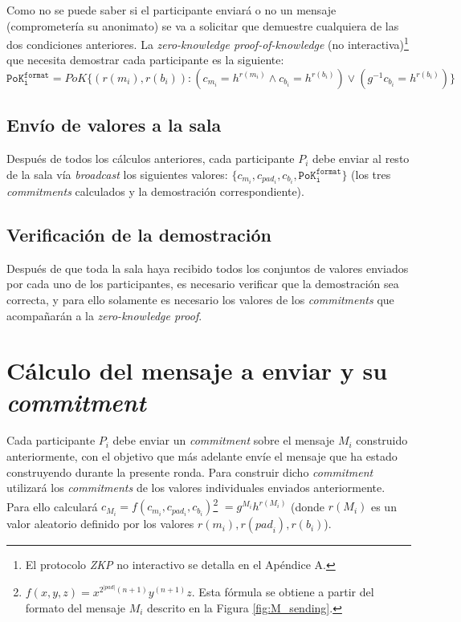Como no se puede saber si el participante enviará o no un mensaje 
(comprometería su anonimato) se va a solicitar que demuestre cualquiera de las 
dos condiciones anteriores. La \emph{zero-knowledge proof-of-knowledge} (no 
interactiva)\footnote{El protocolo \emph{ZKP} no interactivo se detalla en el 
Apéndice A.} que necesita demostrar cada participante es la siguiente: 
$$\mathtt{PoK_i^{format}} = PoK\{(r(m_i), r(b_i)) : (c_{m_i} = h^{r(m_i)} 
\land c_{b_i} = h^{r(b_i)}) \lor (g^{-1} c_{b_i} = h^{r(b_i)})\}$$

\subsection{Envío de valores a la sala}

Después de todos los cálculos anteriores, cada participante $P_i$ debe enviar 
al resto de la sala vía \emph{broadcast} los siguientes valores: 
$\{c_{m_i}, c_{pad_i}, c_{b_i}, \mathtt{PoK_i^{format}}\}$ (los tres 
\emph{commitments} calculados y la demostración correspondiente).

\subsection{Verificación de la demostración}

Después de que toda la sala haya recibido todos los conjuntos de valores 
enviados por cada uno de los participantes, es necesario verificar que la 
demostración sea correcta, y para ello solamente es necesario los valores de 
los \emph{commitments} que acompañarán a la \emph{zero-knowledge proof}.

\section{Cálculo del mensaje a enviar y su \emph{commitment}}

Cada participante $P_i$ debe enviar un \emph{commitment} sobre el mensaje $M_i$ 
construido anteriormente, con el objetivo que más adelante envíe el mensaje 
que ha estado construyendo durante la presente ronda. Para construir dicho 
\emph{commitment} utilizará los \emph{commitments} de los valores individuales 
enviados anteriormente. 
Para ello calculará $c_{M_i} = f(c_{m_i}, c_{pad_i}, c_{b_i})$\footnote{
$f(x, y, z) = x^{2^{|pad|}(n+1)} y^{(n+1)} z$. Esta fórmula se obtiene a partir del formato del mensaje $M_i$ descrito en la Figura \ref{fig:M_sending}.} 
$= g^{M_i} h^{r({M}_i)}$ (donde $r({M}_i)$ es un valor aleatorio definido por 
los valores $r(m_i), r({pad}_i), r(b_i)$). 

